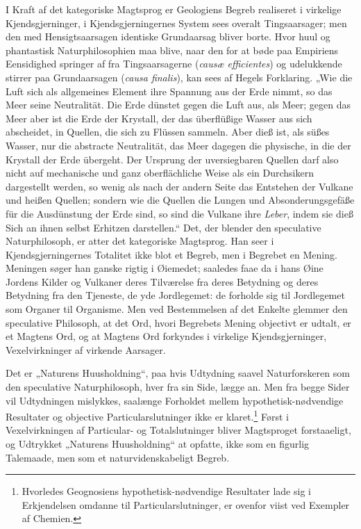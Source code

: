 \documentclass[12pt]{book}
\newcommand{\opage}[1]{\marginnote{\footnotesize\textit{[#1]}}}
\begin{document}
I Kraft af det kategoriske Magtsprog er Geologiens Begreb realiseret i virkelige Kjendsgjerninger, i Kjendsgjerningernes System sees overalt Tingsaarsager; men den med Hensigtsaarsagen identiske Grundaarsag bliver borte. Hvor huul og phantastisk Naturphilosophien maa blive, naar den for at bøde paa Empiriens Eensidighed springer af fra Tingsaarsagerne (\textit{causæ efficientes}) og udelukkende stirrer paa Grundaarsagen (\textit{causa finalis}), kan sees af Hegels Forklaring. „Wie die Luft sich als allgemeines Element ihre Spannung aus der Erde nimmt, so das Meer seine Neutralität. Die Erde dünstet gegen die Luft aus, als Meer; gegen das Meer aber ist die Erde der Krystall, der das überflüßige Wasser aus sich abscheidet, in Quellen, die sich zu Flüssen sammeln. Aber dieß ist, als süßes Wasser, nur die abstracte Neutralität, das Meer dagegen die physische, in die der Krystall der Erde übergeht. Der Ursprung der uversiegbaren %
Quellen darf also nicht auf mechanische und ganz oberflächliche Weise als ein Durchsikern %
dargestellt werden, so wenig als nach der andern Seite das Entstehen der Vulkane und heißen Quellen; sondern wie die Quellen die Lungen und Absonderungsgefäße für die Ausdünstung der Erde sind, so sind die Vulkane ihre \emph{Leber}, indem sie dieß Sich an ihnen selbst Erhitzen darstellen.“ Det, der blender den speculative Naturphilosoph, er atter det kategoriske Magtsprog. Han seer i Kjendsgjerningernes Totalitet ikke blot et Begreb, men i Begrebet en Mening. Meningen søger han ganske rigtig i Øiemedet; saaledes faae da i hans Øine Jordens Kilder og Vulkaner deres Tilværelse fra deres Betydning og deres Betydning fra den Tjeneste, de yde Jordlegemet: de forholde sig til Jordlegemet som Organer til Organisme. Men ved Bestemmelsen af det Enkelte glemmer den speculative Philosoph, at det Ord, hvori Begrebets Mening objectivt er udtalt,
\opage{432}er et Magtens Ord, og at Magtens Ord forkyndes i virkelige Kjendsgjerninger, Vexelvirkninger af virkende Aarsager.

Det er „Naturens Huusholdning“, paa hvis Udtydning saavel Naturforskeren som den speculative Naturphilosoph, hver fra sin Side, lægge an. Men fra begge Sider vil Udtydningen mislykkes, saalænge Forholdet mellem hypothetisk-nødvendige Resultater og objective Particularslutninger ikke er klaret.\footnote{Hvorledes Geognosiens hypothetisk-nødvendige Resultater lade sig i Erkjendelsen omdanne til Particularslutninger, er ovenfor viist ved Exempler af Chemien.}%
{} Først i Vexelvirkningen af Particular- og Totalslutninger bliver Magtsproget forstaaeligt, og Udtrykket „Naturens Huusholdning“ at opfatte, ikke som en figurlig Talemaade, men som et naturvidenskabeligt Begreb.
\end{document}
